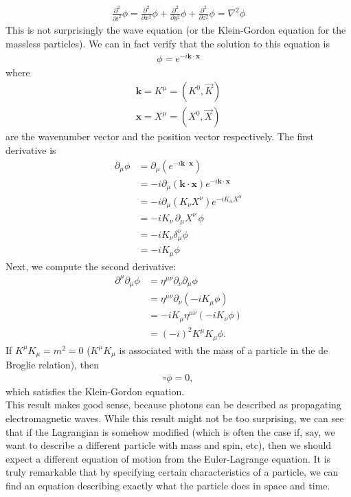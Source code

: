 \documentclass{article}
\newcommand{\p}{\partial}
\newcommand{\f}[2]{\frac{#1}{#2}}
\begin{document}
\begin{align}
\boxed{\f{\p^2}{\p t^2}\phi = \f{\p^2}{\p x^2}\phi + \f{\p^2}{\p y^2}\phi + \f{\p^2}{\p z^2}\phi = \nabla^2\phi}
\end{align}
This is not surprisingly the wave equation (or the Klein-Gordon equation for the massless particles). We can in fact verify that the solution to this equation is
\begin{align}
\phi = e^{-i \mathbf{k}\cdot \mathbf{x}}
\end{align}
where 
\begin{align}
\mathbf{k} = K^\mu = (K^0, \vec{K})\\
\mathbf{x} = X^\mu = (X^0, \vec{X})
\end{align}
are the wavenumber vector and the position vector respectively. The first derivative is
\begin{align}
\partial_\mu \phi &= \partial_\mu \left(e^{-i\mathbf{k}\cdot\mathbf{x}} \right)\nonumber\\
&= -i\partial_\mu \left( \mathbf{k}\cdot\mathbf{x}\right)e^{-i\mathbf{k}\cdot\mathbf{x}}
\nonumber\\
&= -i\partial_\mu \left(K_\nu X^\nu\right) e^{-iK_\alpha X^\alpha}\nonumber\\
&= -iK_\nu\, \partial_\mu X^\nu\,\phi\nonumber\\
&= -iK_\nu \delta^\nu_\mu \phi\nonumber\\
&= -iK_\mu \phi 
\end{align} 
Next, we compute the second derivative:
\begin{align}
\partial^\mu \partial_\mu \phi &= \eta^{\mu\nu}\partial_\nu\partial_\mu\phi\nonumber\\
&= \eta^{\mu\nu}\partial_\nu \left( -iK_\mu\phi \right)\nonumber\\
&= -iK_\mu\eta^{\mu\nu}\left( -iK_\nu\phi \right)\nonumber\\
&= (-i)^2 K^\mu K_\mu \phi.
\end{align}
If $K^\mu K_\mu = m^2 = 0$ ($K^\mu K_\mu$ is associated with the mass of a particle in the de Broglie relation), then 
\begin{align}
\square \phi = 0, 
\end{align}
which satisfies the Klein-Gordon equation.\\

This result makes good sense, because photons can be described as propagating electromagnetic waves. While this result might not be too surprising, we can see that if the Lagrangian is somehow modified (which is often the case if, say, we want to describe a different particle with mass and spin, etc), then we should expect a different equation of motion from the Euler-Lagrange equation. It is truly remarkable that by specifying certain characteristics of a particle, we can find an equation describing exactly what the particle does in space and time. 
\end{document}
